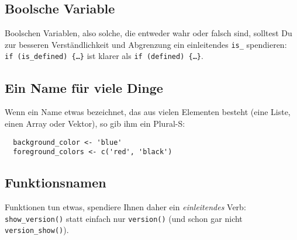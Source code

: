\documentclass[twoside]{scrreprt}
\providecommand{\code}[1]{\texttt{#1}}
\begin{document}
\subsection{Boolsche Variable}
Boolschen Variablen, also solche, die entweder wahr oder falsch sind, solltest
Du zur besseren Verst\"a{}ndlichkeit und Abgrenzung ein einleitendes \code{is\_}
spendieren: \linebreak\code{ if~(is\_defined)~\{\ldots\}} ist klarer als
\code{if~(defined)~\{\ldots\}}.

\subsection{Ein Name f\"u{}r viele Dinge}
Wenn ein Name etwas bezeichnet, das aus vielen Elementen besteht (eine Liste,
einen Array oder Vektor), so gib ihm ein Plural-S:
\begin{lstlisting}
  background_color <- 'blue'
  foreground_colors <- c('red', 'black')
\end{lstlisting}

\subsection{Funktionsnamen}
Funktionen tun etwas, spendiere Ihnen daher ein \emph{einleitendes} Verb:
\code{show\_version()} statt einfach nur \code{version()} (und schon gar nicht 
\code{version\_show()}).
\end{document}
